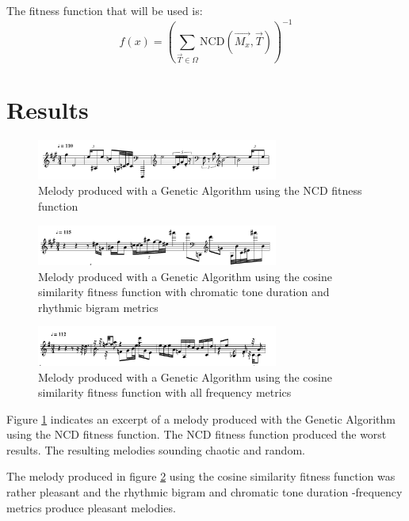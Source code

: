 The fitness function that will be used is:
\[f(x) =  \left(\sum_{\vec{T}\in\Omega} \text{NCD}(\vec{M_x}, \vec{T}) \right)^{-1}\]


\section{Results}
\begin{figure}
\centerline{\includegraphics[width=300px]{../images/genetic_ncd.pdf}}
\caption{Melody produced with a Genetic Algorithm using the \ac{NCD} fitness function}
\label{ims:genetic_mel_ncd}
\end{figure}

\begin{figure}
\centerline{\includegraphics[width=300px]{../images/genetic_cosine_ctd_rb.pdf}}
\caption{Melody produced with a Genetic Algorithm using the cosine similarity fitness function with chromatic tone duration and rhythmic bigram metrics}
\label{ims:genetic_mel_ctdrb}
\end{figure}

\begin{figure}
\centerline{\includegraphics[width=300px]{../images/genetic_cosine_all.pdf}}
\caption{Melody produced with a Genetic Algorithm using the cosine similarity fitness function with all frequency metrics}
\label{ims:genetic_mel_mall}
\end{figure}

Figure \ref{ims:genetic_mel_ncd} indicates an excerpt of a melody produced with the Genetic Algorithm using the \ac{NCD} fitness function. The \ac{NCD} fitness function produced the worst results. The resulting melodies sounding chaotic and random.

The melody produced in figure \ref{ims:genetic_mel_ctdrb} using the cosine similarity fitness function was rather pleasant and the rhythmic bigram and chromatic tone duration -frequency metrics produce pleasant melodies.


